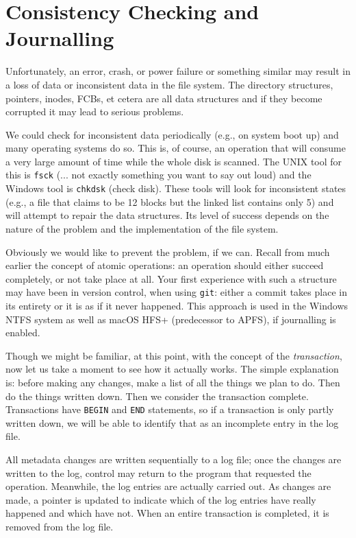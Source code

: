 \section*{Consistency Checking and Journalling}

Unfortunately, an error, crash, or power failure or something similar may result in a loss of data or inconsistent data in the file system. The directory structures, pointers, inodes, FCBs, et cetera are all data structures and if they become corrupted it may lead to serious problems.

We could check for inconsistent data periodically (e.g., on system boot up) and many operating systems do so. This is, of course, an operation that will consume a very large amount of time while the whole disk is scanned. The UNIX tool for this is \texttt{fsck} (... not exactly something you want to say out loud) and the Windows tool is \texttt{chkdsk} (check disk). These tools will look for inconsistent states (e.g., a file that claims to be 12 blocks but the linked list contains only 5) and will attempt to repair the data structures. Its level of success depends on the nature of the problem and the implementation of the file system.

Obviously we would like to prevent the problem, if we can. Recall from much earlier the concept of atomic operations: an operation should either succeed completely, or not take place at all. Your first experience with such a structure may have been in version control, when using \texttt{git}: either a commit takes place in its entirety or it is as if it never happened. This approach is used in the Windows NTFS system as well as macOS HFS+ (predecessor to APFS), if journalling is enabled. 

Though we might be familiar, at this point, with the concept of the \textit{transaction}, now let us take a moment to see how it actually works. The simple explanation is: before making any changes, make a list of all the things we plan to do. Then do the things written down. Then we consider the transaction complete. Transactions have \texttt{BEGIN} and \texttt{END} statements, so if a transaction is only partly written down, we will be able to identify that as an incomplete entry in the log file.

All metadata changes are written sequentially to a log file; once the changes are written to the log, control may return to the program that requested the operation. Meanwhile, the log entries are actually carried out. As changes are made, a pointer is updated to indicate which of the log entries have really happened and which have not. When an entire transaction is completed, it is removed from the log file. 

